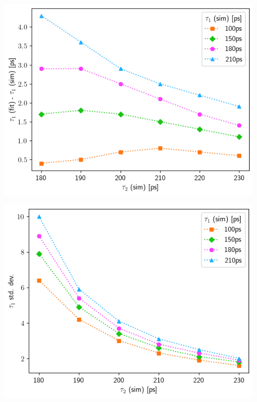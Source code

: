 {\begin{minipage}{.47\linewidth}
    \includegraphics[width=\linewidth]{Batch 3/single Gaussian IRF/t1-diff 5050.png}
    \label{fig:compirf-t1-5050}
\end{minipage}
\hfill
\begin{minipage}{.47\linewidth}
     
    \includegraphics[width=\linewidth]{Batch 3/single Gaussian IRF/t1-err 5050.png}
    \label{fig:compirf-t1err-5050}
\end{minipage}
\begin{minipage}{.47\linewidth}
     

\end{minipage}}
